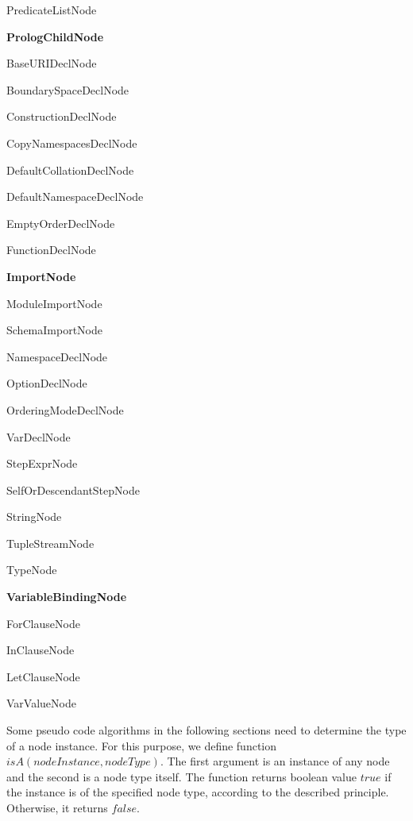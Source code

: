 \begin{description}
\begin{description}
\item PredicateListNode
\item \textbf{PrologChildNode}
  \begin{description}
  \item BaseURIDeclNode
  \item BoundarySpaceDeclNode
  \item ConstructionDeclNode
  \item CopyNamespacesDeclNode
  \item DefaultCollationDeclNode
  \item DefaultNamespaceDeclNode
  \item EmptyOrderDeclNode
  \item FunctionDeclNode
  \item \textbf{ImportNode}
    \begin{description}
    \item ModuleImportNode
    \item SchemaImportNode
    \end{description}
  \item NamespaceDeclNode
  \item OptionDeclNode
  \item OrderingModeDeclNode
  \item VarDeclNode
  \end{description}
\item StepExprNode
  \begin{description}
  \item SelfOrDescendantStepNode
  \end{description}
\item StringNode
\item TupleStreamNode
\item TypeNode
\item \textbf{VariableBindingNode}
  \begin{description}
  \item ForClauseNode
  \item InClauseNode
  \item LetClauseNode
  \end{description}
\item VarValueNode
\end{description}
\end{description}

Some pseudo code algorithms in the following sections need to determine the type of a node instance. For this purpose, we define function $isA(nodeInstance, nodeType)$. The first argument is an instance of any node and the second is a node type itself. The function returns boolean value $true$ if the instance is of the specified node type, according to the described principle. Otherwise, it returns $false$.

